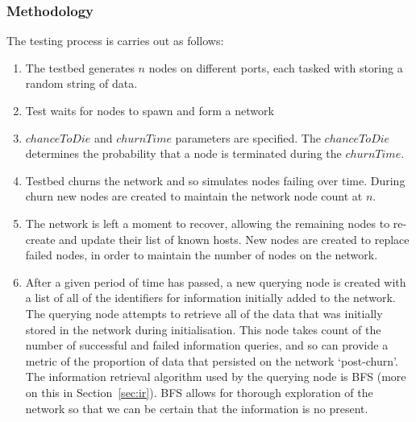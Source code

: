 \subsubsection{Methodology}
\label{sec:churnTesting}

The testing process is carries out as follows:

\begin{enumerate}
    \item The testbed generates $n$ nodes on different ports, each tasked with storing a random string of data.
    \item Test waits for nodes to spawn and form a network
    \item $chanceToDie$ and $churnTime$ parameters are specified. The $chanceToDie$ determines the probability that a node is terminated during the $churnTime$.
    \item Testbed churns the network and so simulates nodes failing over time. During churn new nodes are created to maintain the network node count at $n$.
    \item The network is left a moment to recover, allowing the remaining nodes to re-create and update their list of known hosts. New nodes are created to replace failed nodes, in order to maintain the number of nodes on the network.
    \item After a given period of time has passed, a new querying node is created with a list of all of the identifiers for information initially added to the network. The querying node attempts to retrieve all of the data that was initially stored in the network during initialisation. This node takes count of the number of successful and failed information queries, and so can provide a metric of the proportion of data that persisted on the network `post-churn'. The information retrieval algorithm used by the querying node is BFS (more on this in Section~\ref{sec:ir}). BFS allows for thorough exploration of the network so that we can be certain that the information is no present.
\end{enumerate}


